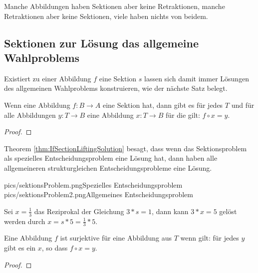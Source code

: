 \documentclass[parskip=half]{scrreprt}
\begin{document}
\begin{remark}
Manche Abbildungen haben Sektionen aber keine Retraktionen, manche Retraktionen
aber keine Sektionen, viele haben nichts von beidem.
\end{remark}

\newpage
\subsection{Sektionen zur Lösung das allgemeine Wahlproblems}

\begin{remark}
Existiert zu einer Abbildung $f$ eine Sektion $s$ lassen sich damit immer 
Lösungen des allgemeinen Wahlproblems konstruieren, wie der nächste Satz belegt.
\end{remark}

\begin{theorem}\label{thm:IfSectionLiftgingSolution}
Wenn eine Abbildung $f: B → A$ eine Sektion hat,
dann gibt es für jedes $T$ und für alle Abbildungen $y: T → B$ eine Abbildung
$x: T → B$ für die gilt: $f ∘ x = y$.
\end{theorem}
\begin{proof}
\end{proof}

\begin{remark}
Theorem \ref{thm:IfSectionLiftingSolution} besagt, dass wenn das Sektionsproblem
als spezielles Entscheidungsproblem eine Lösung hat, dann haben alle 
allgemeineren strukturgleichen Entscheidungsprobleme eine Lösung.

\doublegraphics%
	{pics/sektionsProblem.png}{Spezielles Entscheidungsproblem}%
	{pics/sektionsProblem2.png}{Allgemeines Entscheidungsproblem}
\end{remark}

\begin{analogon}[Reziprokale]
Sei $x = \frac{1}{3}$ das Reziprokal der Gleichung $3 * s = 1$,
dann kann $3 * x = 5$ gelöst werden durch $x = s * 5 = \frac{1}{3} * 5$.
\end{analogon}

\begin{theorem}
Eine Abbildung $f$ ist surjektive für eine Abbildung aus $T$ wenn gilt:
für jedes $y$ gibt es ein $x$, so dass $f ∘ x = y$.
\end{theorem}
\begin{proof}
\end{proof}
\end{document}

